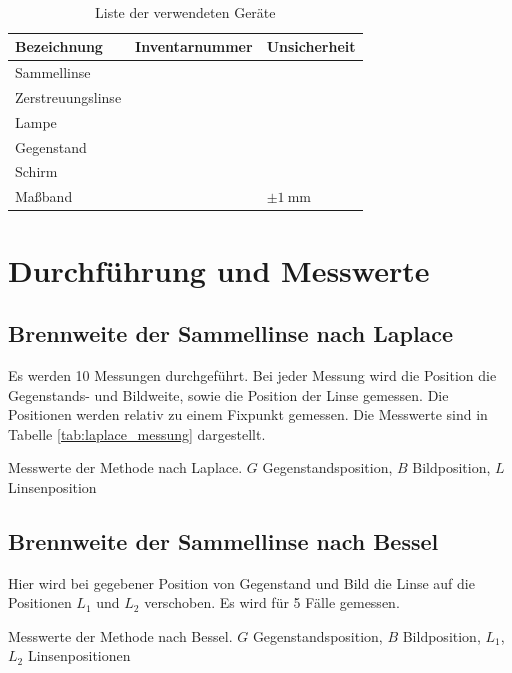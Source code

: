 \documentclass{article}
\begin{document}
\begin{table}[H]
\caption{Liste der verwendeten Geräte}

~

\begin{tabular}{l|ll}
Bezeichnung & Inventarnummer & Unsicherheit \\
\hline
Sammellinse & & \\
Zerstreuungslinse & & \\
Lampe & & \\
Gegenstand & & \\
Schirm & & \\
Maßband & & $\pm1~$mm
\end{tabular}

\end{table}




\section{Durchführung und Messwerte}

\subsection{Brennweite der Sammellinse nach Laplace}

Es werden 10 Messungen durchgeführt. Bei jeder Messung wird die Position die Gegenstands- und Bildweite, sowie die Position der Linse gemessen. Die Positionen werden relativ zu einem Fixpunkt gemessen. Die Messwerte sind in Tabelle \ref{tab:laplace_messung} dargestellt.

\begin{table}[H]
\caption{Messwerte der Methode nach Laplace. $G$ Gegenstandsposition, $B$ Bildposition, $L$ Linsenposition}
\label{tab:laplace_messung}
\centering

\end{table}

\subsection{Brennweite der Sammellinse nach Bessel}

Hier wird bei gegebener Position von Gegenstand und Bild die Linse auf die Positionen $L_1$ und $L_2$ verschoben. Es wird für 5 Fälle gemessen.


\begin{table}[H]
\caption{Messwerte der Methode nach Bessel. $G$ Gegenstandsposition, $B$ Bildposition, $L_1$, $L_2$ Linsenpositionen}
\label{tab:bessel_messung}
\centering

\end{table}
\end{document}
